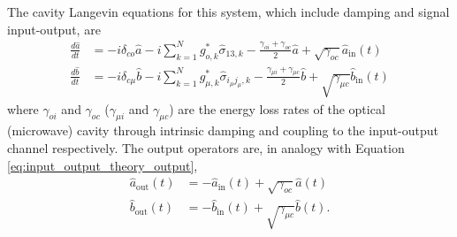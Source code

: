 The cavity Langevin equations for this system, which include damping and signal input-output, are
\begin{align}
    \frac{d\hat{a}}{dt} &= -i\delta_{co}\hat{a} - i\sum_{k=1}^{N} g_{o,k}^*\hat{\sigma}_{13,k} - \frac{\gamma_{oi}+\gamma_{oc}}{2}\hat{a} + \sqrt{\gamma_{oc}}\hat{a}_\text{in}(t) \label{eq:optical_cavity_quantum_langevin}\\
    \frac{d\hat{b}}{dt} &= -i\delta_{c\mu}\hat{b} - i\sum_{k=1}^{N} g_{\mu,k}^*\hat{\sigma}_{i_\mu j_\mu,k} - \frac{\gamma_{\mu i}+\gamma_{\mu c}}{2}\hat{b} + \sqrt{\gamma_{\mu c}}\hat{b}_\text{in}(t)
\end{align}
where $\gamma_{oi}$ and $\gamma_{oc}$ ($\gamma_{\mu i}$ and $\gamma_{\mu c}$) are the energy loss rates of the optical (microwave) cavity through intrinsic damping and coupling to the input-output channel respectively. The output operators are, in analogy with Equation \ref{eq:input_output_theory_output},
\begin{align}
    \hat{a}_\text{out}(t) &= -\hat{a}_\text{in}(t) + \sqrt{\gamma_{oc}}\hat{a}(t) \label{eq:input_output_relation_a}\\
    \hat{b}_\text{out}(t) &= -\hat{b}_\text{in}(t) + \sqrt{\gamma_{\mu c}}\hat{b}(t) \label{eq:input_output_relation_b}.
\end{align}

